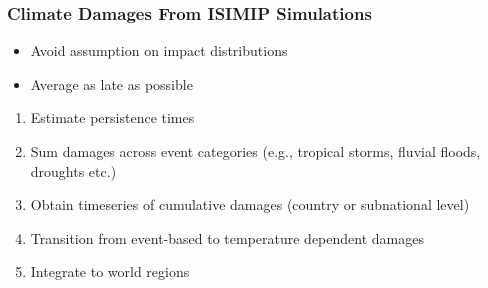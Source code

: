 \documentclass[
c,
11pt,
aspectratio=169, %
final,
]{beamer}
\begin{document}
\begin{frame}
  \frametitle{Climate Damages From ISIMIP Simulations}
  \begin{itemize}
  \item Avoid assumption on impact distributions
  \item Average as late as possible
  \end{itemize}
  \begin{enumerate}
  \item Estimate persistence times
  \item Sum damages across event categories (e.g., tropical storms, fluvial floods, droughts etc.)
  \item Obtain timeseries of cumulative damages (country or subnational level)
  \item Transition from event-based to temperature dependent damages
  \item Integrate to world regions  
  \end{enumerate}
\end{frame}
\end{document}

